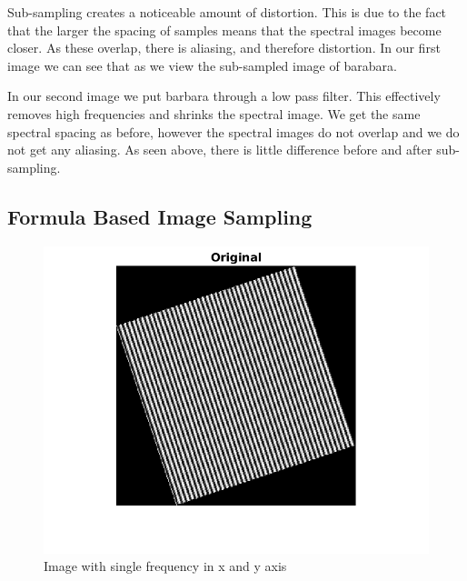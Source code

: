 Sub-sampling creates a noticeable amount of distortion. This is due to the fact
that the larger the spacing of samples means that the spectral images become
closer. As these overlap, there is aliasing, and therefore distortion. In our
first image we can see that as we view the sub-sampled image of barabara.

In our second image we put barbara through a low pass filter. This effectively
removes high frequencies and shrinks the spectral image. We get the same
spectral spacing as before, however the spectral images do not overlap and we do
not get any aliasing. As seen above, there is little difference before and after
sub-sampling.

\subsection{Formula Based Image Sampling}

\begin{figure}[H]
    \centering
    \includegraphics[scale=0.75]{original_sine.png}
    \caption{Image with single frequency in x and y axis}
\end{figure}

